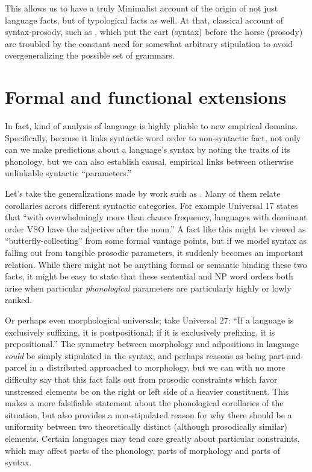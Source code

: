 \documentclass{article}
\begin{document}
This allows us to have a truly Minimalist account of the origin of not just language facts, but of typological facts as well.
At that, classical account of syntax-prosody, such as \parencite{halle87}, which put the cart (syntax) before the horse (prosody) are troubled by the constant need for somewhat arbitrary stipulation to avoid overgeneralizing the possible set of grammars.

\section{Formal and functional extensions\label{exten}}

In fact, kind of analysis of language is highly pliable to new empirical domains.
Specifically, because it links syntactic word order to non-syntactic fact, not only can we make predictions about a language's syntax by noting the traits of its phonology, but we can also establish causal, empirical links between otherwise unlinkable syntactic ``parameters.''

Let's take the generalizations made by work such as \textcite{greenberg63}.
Many of them relate corollaries across different syntactic categories.
For example Universal 17 states that ``with overwhelmingly more than chance frequency, languages with dominant order VSO have the adjective after the noun.''
A fact like this might be viewed as ``butterfly-collecting'' from some formal vantage points, but if we model syntax as falling out from tangible prosodic parameters, it suddenly becomes an important relation.
While there might not be anything formal or semantic binding these two facts, it might be easy to state that these sentential and NP word orders both arise when particular \textit{phonological} parameters are particularly highly or lowly ranked.

Or perhaps even morphological universals; take Universal 27: ``If a language is exclusively suffixing, it is postpositional; if it is exclusively prefixing, it is prepositional.''
The symmetry between morphology and adpositions in language \emph{could} be simply stipulated in the syntax, and perhaps reasons as being part-and-parcel in a distributed approached to morphology, but we can with no more difficulty say that this fact falls out from prosodic constraints which favor unstressed elements be on the right or left side of a heavier constituent.
This makes a more falsifiable statement about the phonological corollaries of the situation, but also provides a non-stipulated reason for why there should be a uniformity between two theoretically distinct (although prosodically similar) elements.
Certain languages may tend care greatly about particular constraints, which may affect parts of the phonology, parts of morphology and parts of syntax.
\end{document}
